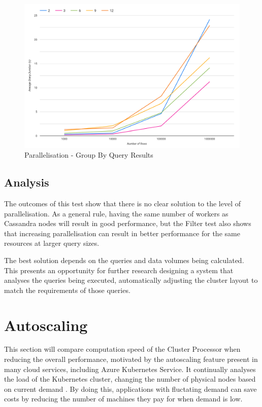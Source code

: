 \begin{figure}[ht]
	\centering
	\includegraphics[width=0.8\linewidth]{chapters/diagrams/testing/group-by-simple-parallelisation-test}
	\caption{Parallelisation - Group By Query Results}
	\label{fig:group-by-simple-parallelisation-test}
\end{figure}

\subsection{Analysis}
The outcomes of this test show that there is no clear solution to the level of parallelisation. As a general rule, having the same number of workers as Cassandra nodes will result in good performance, but the Filter test also shows that increasing parallelisation can result in better performance for the same resources at larger query sizes. 

The best solution depends on the queries and data volumes being calculated. This presents an opportunity for further research designing a system that analyses the queries being executed, automatically adjusting the cluster layout to match the requirements of those queries.

\section{Autoscaling}
This section will compare computation speed of the Cluster Processor when reducing the overall performance, motivated by the autoscaling feature present in many cloud services, including Azure Kubernetes Service. It continually analyses the load of the Kubernetes cluster, changing the number of physical nodes based on current demand \cite{aksautoscaling}. By doing this, applications with fluctating demand can save costs by reducing the number of machines they pay for when demand is low.

